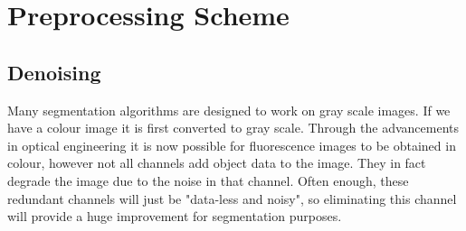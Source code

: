 \section{Preprocessing Scheme}
\label{sec:preprocessscheme}



\subsection{Denoising}
\label{sec:PoissonDenoising}

\begin{definition}
	Many segmentation algorithms are designed to work on gray scale images. If we have a colour image it is first converted to gray scale. Through the advancements in optical engineering it is now possible for fluorescence images to be obtained in colour, however not all channels add object data to the image. They in fact degrade the image due to the noise in that channel.  Often enough, these redundant channels will just be "data-less and noisy", so eliminating this channel will provide a huge improvement for segmentation purposes.
\end{definition}

